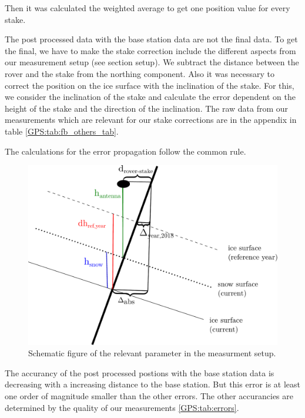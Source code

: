 Then it was calculated the weighted average to get one position value for every stake.

The post processed data with the base station data are not the final data. 
To get the final, we have to make the stake correction include the different aspects from our measurement setup (see section setup).
We subtract the distance between the rover and the stake from the northing component.
Also it was necessary to correct the position on the ice surface with the inclination of the stake. 
For this, we consider the inclination of the stake and calculate the error dependent on the height of the stake and the direction of the inclination.
The raw data from our measurements which are relevant for our stake corrections are in the appendix in table \ref{GPS:tab:fb_others_tab}.
\medskip

The calculations for the error propagation follow the common rule.

\begin{figure}
\centering
\includegraphics[width=0.9\linewidth]{./figs/pictures/schematic_setup.pdf}
\caption{Schematic figure of the relevant parameter in the measurment setup.}
\end{figure}

The accurancy of the post processed postions with the base station data is decreasing with a increasing distance to the base station. 
But this error is at least one order of magnitude smaller than the other errors. 
The other accurancies are determined by the quality of our measurements \ref{GPS:tab:errors}.


